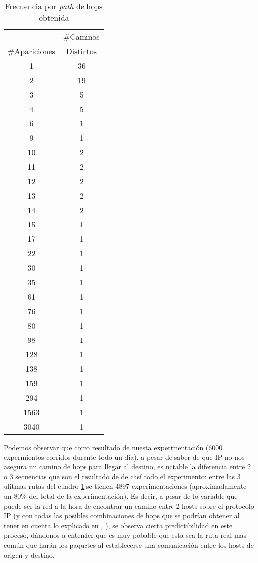 \begin{table}[h]
    \centering
    \begin{tabular}{c | c}
                      &\#Caminos\\
        \#Apariciones &Distintos\\
        \hline\hline
        1& 36\\
        2& 19\\
        3& 5\\
        4& 5\\
        6& 1\\
        9& 1\\
        10& 2\\
        11& 2\\
        12& 2\\
        13& 2\\
        14& 2\\
        15& 1\\
        17& 1\\
        22& 1\\
        30& 1\\
        35& 1\\
        61& 1\\
        76& 1\\
        80& 1\\
        98& 1\\
        128& 1\\
        138& 1\\
        159& 1\\
        294& 1\\
        1563& 1\\
        3040& 1\\
        \hline\hline
    \end{tabular}
    \bigskip
    \caption{Frecuencia por \emph{path} de hops obtenida}
    \label{tab:mcgill_sec_hops}
\end{table}

\par Podemos observar que como resultado de nuesta experimentaci\'on (6000
expermientos corridos durante todo un d\'ia), a pesar de saber de que IP
no nos asegura un camino de hops para llegar al destino, es notable la diferencia
entre 2 o 3 secuencias que son el resultado de de cas\'i todo el experimento:
entre las 3 ulitmas rutas del cuadro \ref{tab:mcgill_sec_hops} se tienen 4897
experimentaciones (aproximadamente un 80\% del total de la experimentaci\'on).
Es decir, a pesar de lo variable que puede ser la red a la hora de encontrar un camino entre 2
hosts sobre el protocolo IP (y con todas las posibles combinaciones de hops que
se podr\'ian obtener al tener en cuenta lo explicado en \emph{,
}), se observa cierta predictibilidad en este proceso,
d\'andonos a entender que es muy pobable que esta sea la ruta real m\'as com\'un
que har\'an los paquetes al establecerse una comunicaci\'on entre los hosts
de origen y destino.

